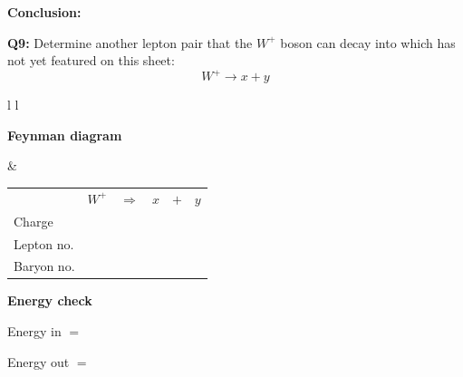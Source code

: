 \documentclass[12pt]{article}
\begin{document}
\vspace{0.5cm}

\textbf{Conclusion:}

\vspace{2.5cm}


\textbf{Q9:} Determine another lepton pair that the $W^+$ boson can decay into which has not yet featured on this sheet:
\[
W^+ \rightarrow x + y
\]

\vspace{0.5cm}

\begin{tabular}{l l}

\begin{minipage}[t]{0.46\textwidth}
\vspace{0pt}
\textbf{Feynman diagram}

\vspace{0.6cm}

\begin{tikzpicture}
\begin{feynman}
  \vertex (W) at (0,2) {};
  \vertex [coordinate] (v) at (3,2) {};

  \vertex (x) at (4,4) {\(x\)};
  \vertex (y) at (5,3) {\(y\)};

  \diagram*{
    (W) -- [boson, edge label=\(W^+\), momentum'={}] (v),
    (v) -- [fermion] (x),
    (v) -- [fermion] (y),
  };
\end{feynman}
\end{tikzpicture}
\end{minipage}
&
\begin{minipage}[t]{0.50\textwidth}
\vspace{0pt}

\renewcommand{\arraystretch}{1.4}
\begin{tabular}{@{}l c c c c c@{}}
 & \(W^+\) & \(\Rightarrow\) & \(x\) & \(+\) & \(y\) \\
Charge &  &  &  &  &  \\
Lepton no. &  &  &  &  &  \\
Baryon no. &  &  &  &  &  \\
\end{tabular}

\vspace{0.6cm}

\textbf{Energy check}

Energy in $=$

Energy out $=$

\end{minipage}

\end{tabular}
\end{document}
